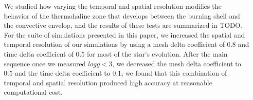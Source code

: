 We studied how varying the temporal and spatial resolution modifies the behavior of the thermohaline zone that develops between the burning shell and the convective envelop, and the results of these tests are summarized in TODO.
For the suite of simulations presented in this paper, we increased the spatial and temporal resolution of our simulations by using a mesh delta coefficient of 0.8 and time delta coefficient of 0.5 for most of the star's evolution.
After the main sequence once we measured $log g < 3$, we decreased the mesh delta coefficient to 0.5 and the time delta coefficient to 0.1; we found that this combination of temporal and spatial resolution produced high accuracy at reasonable computational cost.